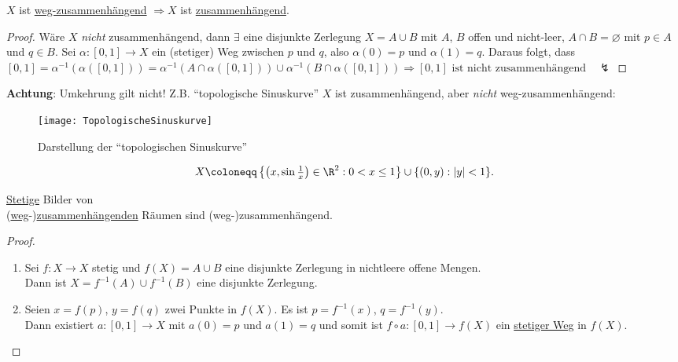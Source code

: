 \begin{lemma}
  \( X \) ist \hyperref[def:wegzusammenhaengend]{weg-zusammenhängend} \( \Rightarrow X \) ist \hyperref[def:zusammenhaengend]{zusammenhängend}.
  \begin{proof}
    Wäre \( X \) \emph{nicht} zusammenhängend, dann \( \exists \) eine disjunkte Zerlegung \( X = A \cup B \) mit \( A \), \( B \) offen und nicht-leer, \( A \cap B = \varnothing \) mit \( p \in A \) und \( q \in B \). Sei \( \alpha: [0,1] \to X \) ein (stetiger) Weg zwischen \( p \) und \( q \), also \( \alpha(0) = p \) und \( \alpha(1) = q \). Daraus folgt, dass \( [0,1] = \alpha^{-1}(\alpha([0,1])) = \alpha^{-1}(A \cap \alpha([0,1])) \cup \alpha^{-1}(B \cap \alpha([0,1])) \Rightarrow [0,1] \text{ ist nicht zusammenhängend} \quad \lightning \)
  \end{proof}

  \begin{minipage}{.45\textwidth}
    \textbf{Achtung}: Umkehrung gilt nicht! Z.B. ``topologische Sinuskurve''\footnotemark{} \( X \) ist zusammenhängend, aber \emph{nicht} weg-zusammenhängend:
  \end{minipage}
  \hfill
  \begin{minipage}{.45\textwidth}
    \begin{figure}[H]
      \texttt{[image: TopologischeSinuskurve]}
      \caption{Darstellung der ``topologischen Sinuskurve''}
    \end{figure}
  \end{minipage}
  \begin{equation*}
    X \coloneqq \left \{ \left( x, \sin\tfrac{1}{x} \right) \in \R^2 : 0 < x \leq 1 \right \} \cup \{ (0,y) : \vert y \vert < 1 \}\text{.}
  \end{equation*}
\end{lemma}

\begin{lemma}
  \hyperref[def:stetig]{Stetige} Bilder von \\ (\hyperref[def:wegzusammenhaengend]{weg}-)\hyperref[def:zusammenhaengend]{zusammenhängenden} Räumen sind (weg-)zusammenhängend.
  \begin{proof}
    \
    \begin{enumerate}
      \item Sei \( f: X \to X \) stetig und \( f(X) = A \cup B \) eine disjunkte Zerlegung in nichtleere offene Mengen. \\
        Dann ist \( X = f^{-1}(A) \cup f^{-1}(B) \) eine disjunkte Zerlegung.
      \item Seien \( x = f(p) \), \( y = f(q) \) zwei Punkte in \( f(X) \). Es ist \( p = f^{-1}(x) \), \( q = f^{-1}(y) \). \\
        Dann existiert \( a: [0,1] \to X \) mit \( a(0) = p \) und \( a(1) = q \) und somit ist \( f \circ a: [0,1] \to f(X) \) ein \hyperref[def:wegzusammenhaengend]{stetiger Weg} in \( f(X) \). 
    \end{enumerate}
  \end{proof}
\end{lemma}

